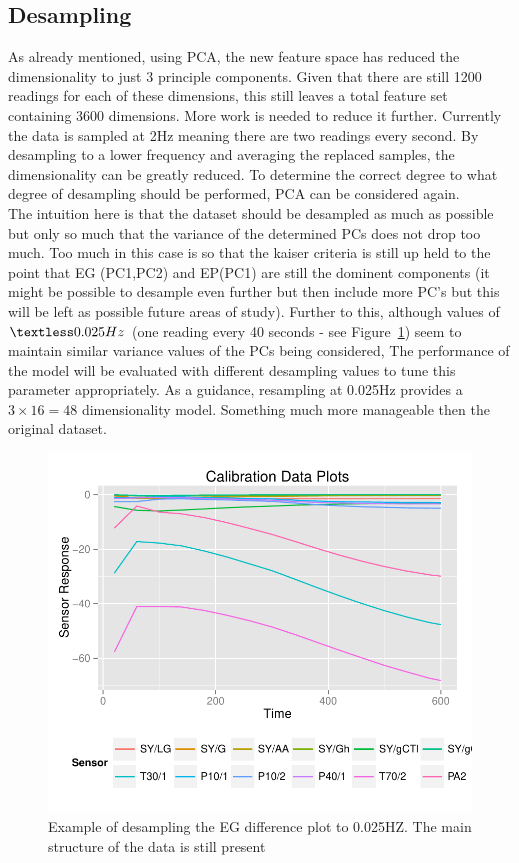 \documentclass[twocolumn]{article}
\begin{document}
\subsection{Desampling}
\label{sec:desampling}
As already mentioned, using PCA, the new feature space has reduced the dimensionality to just 3 principle components. Given that there are still
1200 readings for each of these dimensions, this still leaves a total feature set containing 3600 dimensions. More work is needed
to reduce it further. Currently the data is sampled at 2Hz meaning there are two readings every second. By desampling to a lower 
frequency and averaging the replaced samples, the dimensionality can be greatly reduced. To determine the correct degree to what degree of desampling 
should be performed, PCA can be considered again.\\
The intuition here is that the dataset should be desampled as much as possible but only so much that the variance of the determined PCs
does not drop too much. Too much in this case is so that the kaiser criteria is still up held to the point that EG (PC1,PC2) and EP(PC1) are still
the dominent components (it might be possible to desample even further but then include more PC's but this will be left as possible future 
areas of study). Further to this, although values of $\textless 0.025Hz$ (one reading every 40 seconds - see Figure~\ref{fig:desampledExample}) 
seem to maintain similar variance values of the PCs being considered, The performance of the model will be evaluated with different desampling
values to tune this parameter appropriately. As a guidance, resampling at 0.025Hz provides a $3 \times 16 = 48$ dimensionality model. 
Something much more manageable then the original dataset.

\begin{figure}[h!]
	\includegraphics[trim = 0mm 0mm 0mm 0mm, clip, scale=0.55]{deSampledExample.pdf}
	\caption{Example of desampling the EG difference plot to 0.025HZ. The main structure of the data is still present}
	\label{fig:desampledExample}
\end{figure}
\end{document}
